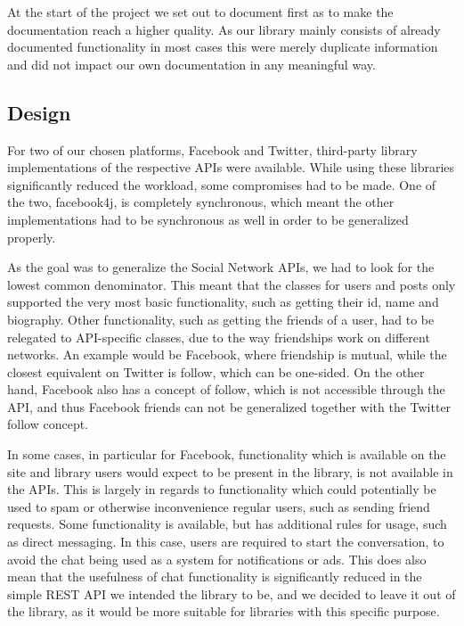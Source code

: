 \documentclass{sigchi-alternate}
\begin{document}
At the start of the project we set out to document first as to make the documentation reach a higher quality. As our library mainly consists of already documented functionality in most cases this were merely duplicate
information and did not impact our own documentation in any meaningful way.

\subsection{Design}
For two of our chosen platforms, Facebook and Twitter, third-party library implementations of the respective APIs were available. While using these libraries significantly reduced the workload, some compromises had to
be made. One of the two, facebook4j, is completely synchronous, which meant the other implementations had to be synchronous as well in order to be generalized properly.

As the goal was to generalize the Social Network APIs, we had to look for the lowest common denominator. This meant that the classes for users and posts only supported the very most basic functionality, such as getting
their id, name and biography. Other functionality, such as getting the friends of a user, had to be relegated to API-specific classes, due to the way friendships work on different networks. An example would be Facebook,
where friendship is mutual, while the closest equivalent on Twitter is follow, which can be one-sided. On the other hand, Facebook also has a concept of follow, which is not accessible through the API, and thus Facebook
friends can not be generalized together with the Twitter follow concept.

In some cases, in particular for Facebook, functionality which is available on the site and library users would expect to be present in the library, is not available in the APIs. This is largely in regards to functionality
which could potentially be used to spam or otherwise inconvenience regular users, such as sending friend requests. Some functionality is available, but has additional rules for usage, such as direct messaging. In this case,
users are required to start the conversation, to avoid the chat being used as a system for notifications or ads. This does also mean that the usefulness of chat functionality is significantly reduced in the simple REST API
we intended the library to be, and we decided to leave it out of the library, as it would be more suitable for libraries with this specific purpose.
\end{document}
